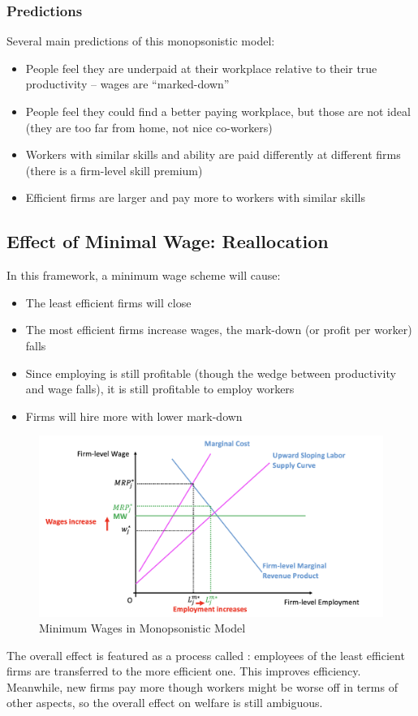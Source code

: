         \subsubsection{Predictions}
            Several main predictions of this monopsonistic model:
            \begin{itemize}
                \item People feel they are underpaid at their workplace relative to their true productivity – wages are “marked-down”
                \item People feel they could find a better paying workplace, but those are not ideal (they are too far from home, not nice co-workers)
                \item Workers with similar skills and ability are paid differently at different firms (there is a firm-level skill premium)
                \item Efficient firms are larger and pay more to workers with similar skills
            \end{itemize}
    
    \subsection{Effect of Minimal Wage: Reallocation}
        In this framework, a minimum wage scheme will cause:
        \begin{itemize}
            \item The least efficient firms will close
            \item The most efficient firms increase wages, the mark-down (or profit per worker) falls
            \item Since employing is still profitable (though the wedge between productivity and wage falls), it is still profitable to employ workers
            \item Firms will hire more with lower mark-down
        \end{itemize}
        \begin{figure}[H]
            \centering
            \includegraphics[width=5in]{images/ch2/Monop_LM_2.png}
            \caption{Minimum Wages in Monopsonistic Model}
        \end{figure}
        The overall effect is featured as a process called : employees of the least efficient firms are transferred to the more efficient one. This improves efficiency. Meanwhile, new firms pay more though workers might be worse off in terms of other aspects, so the overall effect on welfare is still ambiguous.
        
